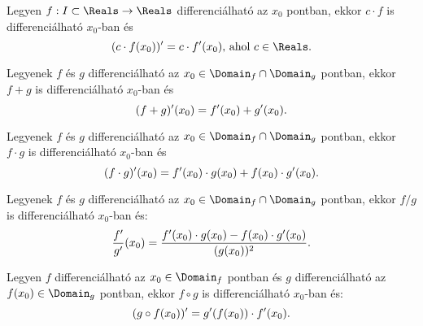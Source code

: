 \begin{statement}

  Legyen $f: I \subset \Reals \rightarrow \Reals$ differenciálható az $x_0$
  pontban, ekkor $c\cdot f$ is differenciálható $x_0$-ban és
  \[
    (c \cdot f(x_0))' = c\cdot f'(x_0)
    \text{, ahol }
    c \in \Reals
    \text.
  \]
\end{statement}

\begin{mdframed}[
    style=statement,
    nobreak=true,
  ]

  Legyenek $f$ és $g$ differenciálható az $x_0 \in \Domain_f \cap \Domain_g$
  pontban, ekkor $f + g$ is differenciálható $x_0$-ban és
  \[
    (f+g)'(x_0) = f'(x_0)+ g'(x_0)
    \text.
  \]
\end{mdframed}


\begin{statement}

  Legyenek $f$ és $g$ differenciálható az $x_0 \in \Domain_f \cap \Domain_g$
  pontban, ekkor $f \cdot g$ is differenciálható $x_0$-ban és
  \[
    (f\cdot g)'(x_0) = f'(x_0)\cdot g(x_0) + f(x_0)\cdot g'(x_0)
    \text.
  \]
\end{statement}

\begin{statement}

  Legyenek $f$ és $g$ differenciálható az $x_0 \in \Domain_f \cap \Domain_g$
  pontban, ekkor $f/g$ is differenciálható $x_0$-ban és:
  \[
    \frac{f'}{g'}(x_0) = \frac{
      f'(x_0)\cdot g(x_0) - f(x_0)\cdot g'(x_0)
    }{
      (g(x_0))^2
    }
    \text.
  \]
\end{statement}

\begin{statement}

  Legyen $f$ differenciálható az $x_0 \in \Domain_f$ pontban és $g$
  differenciálható az $f(x_0)\in \Domain_g$ pontban, ekkor $f \circ g$ is
  differenciálható $x_0$-ban és:
  \[
    (g \circ f(x_0))' = g'(f(x_0))\cdot f'(x_0)
    \text.
  \]
\end{statement}


